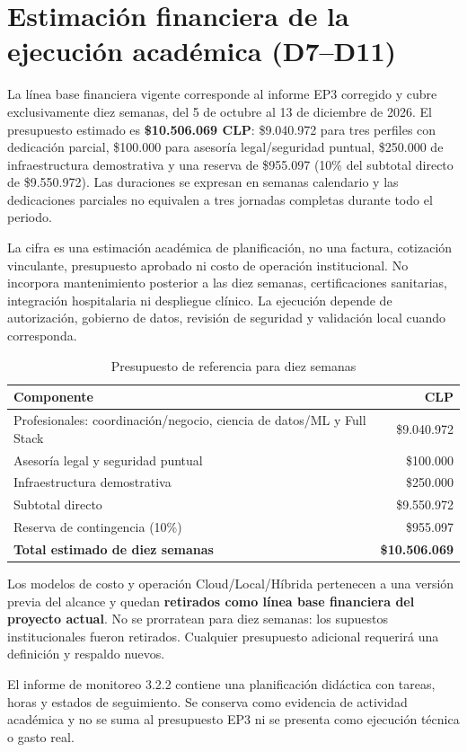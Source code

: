 \section{Estimación financiera de la ejecución académica (D7--D11)}

La línea base financiera vigente corresponde al informe EP3 corregido y cubre exclusivamente diez semanas, del 5 de octubre al 13 de diciembre de 2026. El presupuesto estimado es \textbf{\$10.506.069 CLP}: \$9.040.972 para tres perfiles con dedicación parcial, \$100.000 para asesoría legal/seguridad puntual, \$250.000 de infraestructura demostrativa y una reserva de \$955.097 (10\% del subtotal directo de \$9.550.972). Las duraciones se expresan en semanas calendario y las dedicaciones parciales no equivalen a tres jornadas completas durante todo el periodo.

La cifra es una estimación académica de planificación, no una factura, cotización vinculante, presupuesto aprobado ni costo de operación institucional. No incorpora mantenimiento posterior a las diez semanas, certificaciones sanitarias, integración hospitalaria ni despliegue clínico. La ejecución depende de autorización, gobierno de datos, revisión de seguridad y validación local cuando corresponda.

\begin{table}[H]
  \centering
  \caption{Presupuesto de referencia para diez semanas}
  \label{tab:presupuesto-diez-semanas}
  \small
  \begin{tabular}{lr}
    \toprule
    Componente & CLP \\
    \midrule
    Profesionales: coordinación/negocio, ciencia de datos/ML y Full Stack & \$9.040.972 \\
    Asesoría legal y seguridad puntual & \$100.000 \\
    Infraestructura demostrativa & \$250.000 \\
    Subtotal directo & \$9.550.972 \\
    Reserva de contingencia (10\%) & \$955.097 \\
    \midrule
    \textbf{Total estimado de diez semanas} & \textbf{\$10.506.069} \\
    \bottomrule
  \end{tabular}
\end{table}

Los modelos de costo y operación Cloud/Local/Híbrida pertenecen a una versión previa del alcance y quedan \textbf{retirados como línea base financiera del proyecto actual}. No se prorratean para diez semanas: los supuestos institucionales fueron retirados. Cualquier presupuesto adicional requerirá una definición y respaldo nuevos.

El informe de monitoreo 3.2.2 contiene una planificación didáctica con tareas, horas y estados de seguimiento. Se conserva como evidencia de actividad académica y no se suma al presupuesto EP3 ni se presenta como ejecución técnica o gasto real.
